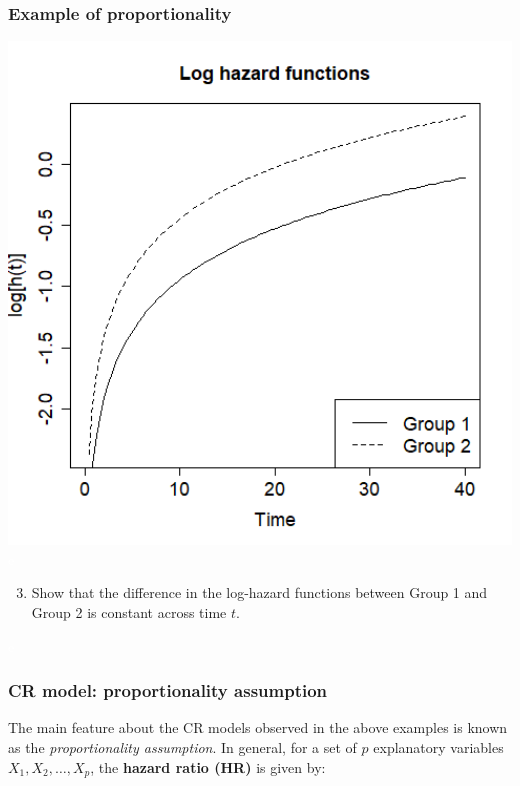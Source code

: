\begin{frame}
\frametitle{Example of proportionality}
\includegraphics[width=1.0\textwidth]{Figures/prop_loghaz_groups.png}\\
\vskip30pt
\textcolor{white}{e}
\emp
\blankcolumn
{}
\begin{enumerate}
\setcounter{enumi}{2}
\item Show that the difference in the log-hazard functions between Group 1 and Group 2 is constant across time $t$.
\end{enumerate}
\vskip200pt
\textcolor{white}{e}
\emp
\end{frame}


\begin{frame}
\frametitle{CR model: proportionality assumption}
The main feature about the CR models observed in the above examples is known as the \textit{proportionality assumption}.  In general, for a set of $p$ explanatory variables $X_1,X_2,\ldots,X_p$, the \textbf{hazard ratio (HR)} is given by:
\vskip200pt


\end{frame}



